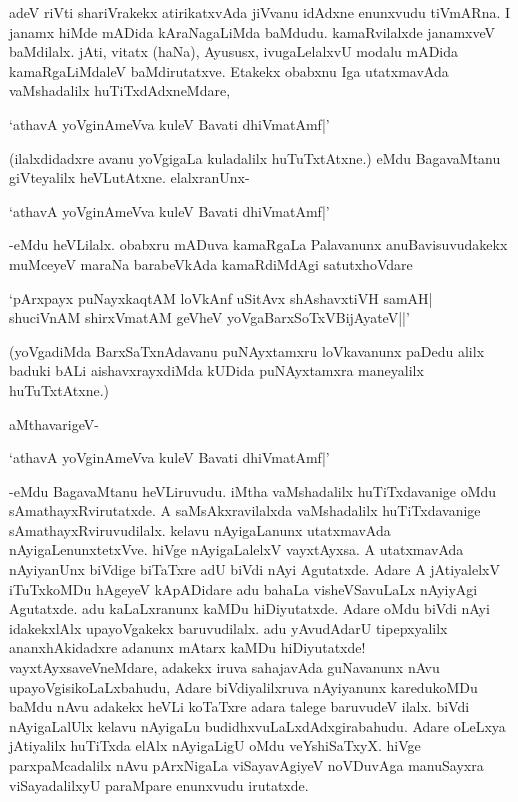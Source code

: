 adeV riVti shariVrakekx atirikatxvAda jiVvanu idAdxne enunxvudu tiVmARna. I janamx hiMde mADida kAraNagaLiMda baMdudu. kamaRvilalxde janamxveV baMdilalx. jAti, vitatx (haNa), Ayususx, ivugaLelalxvU modalu mADida kamaRgaLiMdaleV baMdirutatxve. Etakekx obabxnu Iga utatxmavAda vaMshadalilx huTiTxdAdxneMdare,

\begin{shloka}
`athavA yoVginAmeVva kuleV Bavati dhiVmatAmf|'
\end{shloka}

(ilalxdidadxre avanu yoVgigaLa kuladalilx huTuTxtAtxne.) eMdu BagavaMtanu giVteyalilx heVLutAtxne. elalxranUnx-

\begin{shloka}
`athavA yoVginAmeVva kuleV Bavati dhiVmatAmf|'
\end{shloka}

-eMdu heVLilalx. obabxru mADuva kamaRgaLa Palavanunx anuBavisuvudakekx muMceyeV maraNa barabeVkAda kamaRdiMdAgi satutxhoVdare

\begin{shloka}
`pArxpayx puNayxkaqtAM loVkAnf uSitAvx shAshavxtiVH samAH|\\
shuciVnAM shirxVmatAM geVheV yoVgaBarxSoTxV\s BijAyateV||' 
\end{shloka}

(yoVgadiMda BarxSaTxnAdavanu puNAyxtamxru loVkavanunx paDedu alilx baduki bALi aishavxrayxdiMda kUDida puNAyxtamxra maneyalilx huTuTxtAtxne.)

aMthavarigeV-

\begin{shloka}
`athavA yoVginAmeVva kuleV Bavati dhiVmatAmf|'
\end{shloka}

-eMdu BagavaMtanu heVLiruvudu. iMtha vaMshadalilx huTiTxdavanige oMdu sAmathayxRvirutatxde. A saMsAkxravilalxda vaMshadalilx huTiTxdavanige sAmathayxRviruvudilalx. kelavu nAyigaLanunx utatxmavAda nAyigaLenunxtetxVve. hiVge nAyigaLalelxV vayxtAyxsa. A utatxmavAda nAyiyanUnx biVdige biTaTxre adU biVdi nAyi Agutatxde. Adare A jAtiyalelxV iTuTxkoMDu hAgeyeV kApADidare adu bahaLa visheVSavuLaLx nAyiyAgi Agutatxde. adu kaLaLxranunx kaMDu hiDiyutatxde. Adare oMdu biVdi nAyi idakekxlAlx upayoVgakekx baruvudilalx. adu yAvudAdarU tipepxyalilx ananxhAkidadxre adanunx mAtarx kaMDu hiDiyutatxde! vayxtAyxsaveVneMdare, adakekx iruva sahajavAda guNavanunx nAvu upayoVgisikoLaLxbahudu, Adare biVdiyalilxruva nAyiyanunx karedukoMDu baMdu nAvu adakekx heVLi koTaTxre adara talege baruvudeV ilalx. biVdi nAyigaLalUlx kelavu nAyigaLu budidhxvuLaLxdAdxgirabahudu. Adare oLeLxya jAtiyalilx huTiTxda elAlx nAyigaLigU oMdu veYshiSaTxyX. hiVge parxpaMcadalilx nAvu pArxNigaLa viSayavAgiyeV noVDuvAga manuSayxra viSayadalilxyU paraMpare enunxvudu irutatxde.

